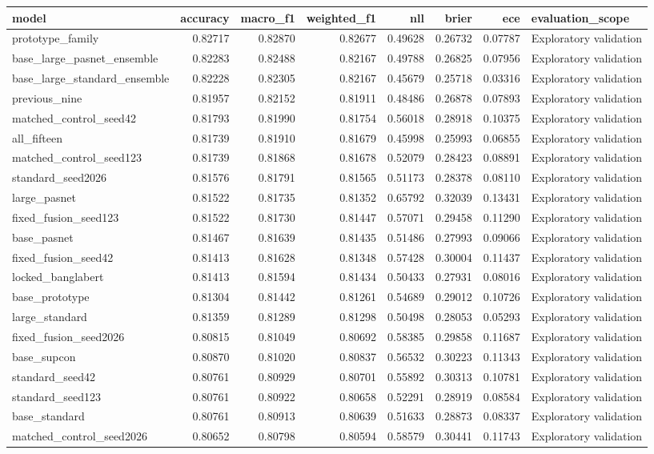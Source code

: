 \begin{tabular}{lrrrrrrl}
\toprule
model & accuracy & macro\_f1 & weighted\_f1 & nll & brier & ece & evaluation\_scope \\
\midrule
prototype\_family & 0.82717 & 0.82870 & 0.82677 & 0.49628 & 0.26732 & 0.07787 & Exploratory validation \\
base\_large\_pasnet\_ensemble & 0.82283 & 0.82488 & 0.82167 & 0.49788 & 0.26825 & 0.07956 & Exploratory validation \\
base\_large\_standard\_ensemble & 0.82228 & 0.82305 & 0.82167 & 0.45679 & 0.25718 & 0.03316 & Exploratory validation \\
previous\_nine & 0.81957 & 0.82152 & 0.81911 & 0.48486 & 0.26878 & 0.07893 & Exploratory validation \\
matched\_control\_seed42 & 0.81793 & 0.81990 & 0.81754 & 0.56018 & 0.28918 & 0.10375 & Exploratory validation \\
all\_fifteen & 0.81739 & 0.81910 & 0.81679 & 0.45998 & 0.25993 & 0.06855 & Exploratory validation \\
matched\_control\_seed123 & 0.81739 & 0.81868 & 0.81678 & 0.52079 & 0.28423 & 0.08891 & Exploratory validation \\
standard\_seed2026 & 0.81576 & 0.81791 & 0.81565 & 0.51173 & 0.28378 & 0.08110 & Exploratory validation \\
large\_pasnet & 0.81522 & 0.81735 & 0.81352 & 0.65792 & 0.32039 & 0.13431 & Exploratory validation \\
fixed\_fusion\_seed123 & 0.81522 & 0.81730 & 0.81447 & 0.57071 & 0.29458 & 0.11290 & Exploratory validation \\
base\_pasnet & 0.81467 & 0.81639 & 0.81435 & 0.51486 & 0.27993 & 0.09066 & Exploratory validation \\
fixed\_fusion\_seed42 & 0.81413 & 0.81628 & 0.81348 & 0.57428 & 0.30004 & 0.11437 & Exploratory validation \\
locked\_banglabert & 0.81413 & 0.81594 & 0.81434 & 0.50433 & 0.27931 & 0.08016 & Exploratory validation \\
base\_prototype & 0.81304 & 0.81442 & 0.81261 & 0.54689 & 0.29012 & 0.10726 & Exploratory validation \\
large\_standard & 0.81359 & 0.81289 & 0.81298 & 0.50498 & 0.28053 & 0.05293 & Exploratory validation \\
fixed\_fusion\_seed2026 & 0.80815 & 0.81049 & 0.80692 & 0.58385 & 0.29858 & 0.11687 & Exploratory validation \\
base\_supcon & 0.80870 & 0.81020 & 0.80837 & 0.56532 & 0.30223 & 0.11343 & Exploratory validation \\
standard\_seed42 & 0.80761 & 0.80929 & 0.80701 & 0.55892 & 0.30313 & 0.10781 & Exploratory validation \\
standard\_seed123 & 0.80761 & 0.80922 & 0.80658 & 0.52291 & 0.28919 & 0.08584 & Exploratory validation \\
base\_standard & 0.80761 & 0.80913 & 0.80639 & 0.51633 & 0.28873 & 0.08337 & Exploratory validation \\
matched\_control\_seed2026 & 0.80652 & 0.80798 & 0.80594 & 0.58579 & 0.30441 & 0.11743 & Exploratory validation \\
\bottomrule
\end{tabular}
